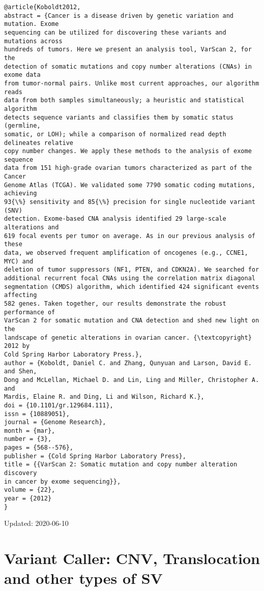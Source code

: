 \documentclass[]{article}
\begin{document}
\begin{verbatim}
@article{Koboldt2012,
abstract = {Cancer is a disease driven by genetic variation and mutation. Exome
sequencing can be utilized for discovering these variants and mutations across
hundreds of tumors. Here we present an analysis tool, VarScan 2, for the
detection of somatic mutations and copy number alterations (CNAs) in exome data
from tumor-normal pairs. Unlike most current approaches, our algorithm reads
data from both samples simultaneously; a heuristic and statistical algorithm
detects sequence variants and classifies them by somatic status (germline,
somatic, or LOH); while a comparison of normalized read depth delineates relative
copy number changes. We apply these methods to the analysis of exome sequence
data from 151 high-grade ovarian tumors characterized as part of the Cancer
Genome Atlas (TCGA). We validated some 7790 somatic coding mutations, achieving
93{\%} sensitivity and 85{\%} precision for single nucleotide variant (SNV)
detection. Exome-based CNA analysis identified 29 large-scale alterations and
619 focal events per tumor on average. As in our previous analysis of these
data, we observed frequent amplification of oncogenes (e.g., CCNE1, MYC) and
deletion of tumor suppressors (NF1, PTEN, and CDKN2A). We searched for
additional recurrent focal CNAs using the correlation matrix diagonal
segmentation (CMDS) algorithm, which identified 424 significant events affecting
582 genes. Taken together, our results demonstrate the robust performance of
VarScan 2 for somatic mutation and CNA detection and shed new light on the
landscape of genetic alterations in ovarian cancer. {\textcopyright} 2012 by
Cold Spring Harbor Laboratory Press.},
author = {Koboldt, Daniel C. and Zhang, Qunyuan and Larson, David E. and Shen,
Dong and McLellan, Michael D. and Lin, Ling and Miller, Christopher A. and
Mardis, Elaine R. and Ding, Li and Wilson, Richard K.},
doi = {10.1101/gr.129684.111},
issn = {10889051},
journal = {Genome Research},
month = {mar},
number = {3},
pages = {568--576},
publisher = {Cold Spring Harbor Laboratory Press},
title = {{VarScan 2: Somatic mutation and copy number alteration discovery
in cancer by exome sequencing}},
volume = {22},
year = {2012}
}
\end{verbatim}

Updated: 2020-06-10
\part{Variant Caller: CNV, Translocation and other types of SV}
\end{document}
